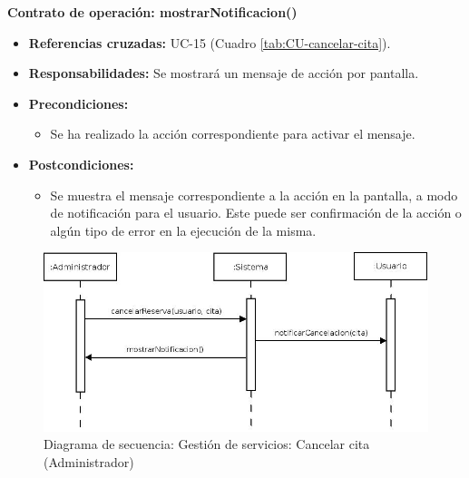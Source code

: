 \textbf{Contrato de operación: mostrarNotificacion()}
\begin{itemize}
\item \textbf{Referencias cruzadas:} UC-15 (Cuadro \ref{tab:CU-cancelar-cita}).
\item \textbf{Responsabilidades:} Se mostrará un mensaje de acción por pantalla.
\item \textbf{Precondiciones:} 
 \begin{itemize}
\item Se ha realizado la acción correspondiente para activar el mensaje.
\end {itemize}
\item \textbf{Postcondiciones:} 
 \begin{itemize}
\item Se muestra el mensaje correspondiente a la acción en la pantalla, a modo de notificación para el usuario. Este puede ser confirmación de la acción o algún tipo de error en la ejecución de la misma.
\end {itemize}
\end {itemize}


\vspace{10mm}

\begin{figure}[H]
\centering
  \includegraphics[scale=.50]{img/secuencias/gestion-servicios-cancelar-cita-por-parte-de-admin.jpeg}
  \caption{Diagrama de secuencia: Gestión de servicios: Cancelar cita (Administrador)}
  \label{fig:secuencia-gestion-servicios-cancelar-cita-por-parte-de-admin}
\end{figure}

